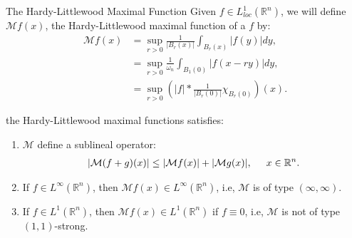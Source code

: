 \lipsum[10]
\begin{definition}{The Hardy-Littlewood Maximal Function}
  Given $f\in L^1_{loc}(\mathbb{R}^{n})$, we will define $\mathcal{M}f(x)$, the Hardy-Littlewood maximal function of a $f$ by:
    \begin{align*}
      \mathcal{M}f(x)&=\sup_{r>0}\frac{1}{|B_r(x)|}\int_{B_r(x)}|f(y)|dy,\\
      &=\sup_{r>0}\frac{1}{\omega_n}\int_{B_1(0)}|f(x-ry)|dy,\\
      &=\sup_{r>0}(|f|*\frac{1}{|B_r(0)|}\chi_{B_r(0)})(x).
    \end{align*}
\end{definition}
\begin{proposition}{}
  the Hardy-Littlewood maximal functions satisfies:
  \begin{enumerate}
    \item $\mathcal{M}$ define a sublineal operator:
      \begin{align*}
        |\mathcal{M}(f+g)(x)|\leq |\mathcal{M}f(x)|+|\mathcal{M}g(x)|, \hspace{0.5cm}x\in\mathbb{R}^{n}.
      \end{align*}
    \item If $f\in L^{\infty}(\mathbb{R}^{n})$, then $\mathcal{M}f(x)\in L^{\infty}(\mathbb{R}^{n})$, i.e, $\mathcal{M}$ is of type $(\infty,\infty)$.
    \item If $f\in L^{1}(\mathbb{R}^{n})$, then $\mathcal{M}f(x)\in L^{1}(\mathbb{R}^{n})$ if $f\equiv 0$, i.e, $\mathcal{M}$ is not of type $(1,1)$-strong. 
    \end{enumerate}
\end{proposition}

